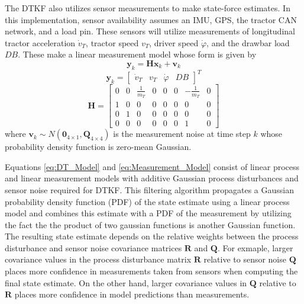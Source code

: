 The DTKF also utilizes sensor measurements to make state-force estimates. In this implementation, sensor availability assumes an IMU, GPS, the tractor CAN network, and a load pin. These sensors will utilize measurements of longitudinal tractor acceleration $\dot v_T$, tractor speed $v_T$, driver speed $\dot\varphi$, and the drawbar load $DB$. These make a linear measurement model whose form is given by
\begin{equation}\label{eq:Measurement_Model}
    \mathbf{y}_k = \mathbf{H}\mathbf{x}_k + \mathbf{v}_k
\end{equation}
\begin{equation}
    \mathbf{y}_k = \begin{bmatrix} \dot v_T & v_T & \dot\varphi & DB \end{bmatrix}^T
\end{equation}
\begin{equation}
    \mathbf{H} = \begin{bmatrix} 
     0 & 0 & \frac{1}{m_T} & 0 & 0 & 0 & -\frac{1}{m_T} & 0\\
     1 & 0 & 0 & 0 & 0 & 0 & 0 & 0\\
     0 & 1 & 0 & 0 & 0 & 0 & 0 & 0\\
     0 & 0 & 0 & 0 & 0 & 0 & 1 & 0 \end{bmatrix}
\end{equation}
where $\mathbf{v}_k \sim N(\mathbf{0}_{4\times1},\mathbf{Q}_{4\times4})$ is the measurement noise at time step $k$ whose probability density function is zero-mean Gaussian.

Equations \ref{eq:DT_Model} and \ref{eq:Measurement_Model} consist of linear process and linear measurement models with additive Gaussian process disturbances and sensor noise required for DTKF. This filtering algorithm propagates a Gaussian probability density function (PDF) of the state estimate using a linear process model and combines this estimate with a PDF of the measurement by utilizing the fact the the product of two gaussian functions is another Gaussian function. The resulting state estimate depends on the relative weights between the process disturbance and sensor noise covariance matrices $\mathbf{R}$ and $\mathbf{Q}$. For exmaple, larger covariance values in the process disturbance matrix $\mathbf{R}$ relative to sensor noise $\mathbf{Q}$ places more confidence in measurements taken from sensors when computing the final state estimate. On the other hand, larger covariance values in $\mathbf{Q}$ relative to $\mathbf{R}$ places more confidence in model predictions than measurements. 

